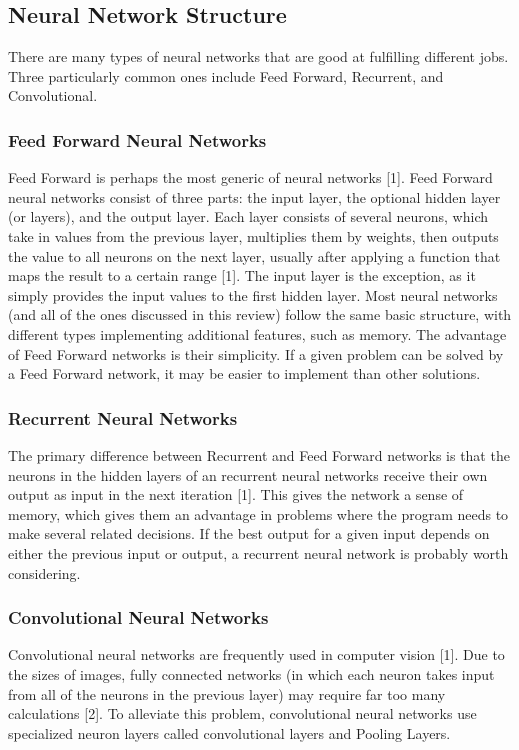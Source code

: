 \documentclass[10pt,journal,compsoc, draftclsnofoot,onecolumn]{IEEEtran}
\begin{document}
\subsection{Neural Network Structure}
There are many types of neural networks that are good at fulfilling different jobs. Three particularly common
ones include Feed Forward, Recurrent, and Convolutional.

\subsubsection{Feed Forward Neural Networks}
Feed Forward is perhaps the most generic of neural networks [1]. Feed Forward neural networks consist of
three parts: the input layer, the optional hidden layer (or layers), and the output layer. Each layer consists of
several neurons, which take in values from the previous layer, multiplies them by weights, then outputs the
value to all neurons on the next layer, usually after applying a function that maps the result to a certain range
[1]. The input layer is the exception, as it simply provides the input values to the first hidden layer.
Most neural networks (and all of the ones discussed in this review) follow the same basic structure, with
different types implementing additional features, such as memory. The advantage of Feed Forward networks
is their simplicity. If a given problem can be solved by a Feed Forward network, it may be easier to implement
than other solutions.

\subsubsection{Recurrent Neural Networks}
The primary difference between Recurrent and Feed Forward networks is that the neurons in the hidden layers
of an recurrent neural networks receive their own output as input in the next iteration [1]. This gives the
network a sense of memory, which gives them an advantage in problems where the program needs to make
several related decisions. If the best output for a given input depends on either the previous input or output, a
recurrent neural network is probably worth considering.

\subsubsection{Convolutional Neural Networks}
Convolutional neural networks are frequently used in computer vision [1]. Due to the sizes of images, fully
connected networks (in which each neuron takes input from all of the neurons in the previous layer) may
require far too many calculations [2]. To alleviate this problem, convolutional neural networks use specialized
neuron layers called convolutional layers and Pooling Layers.
\end{document}

